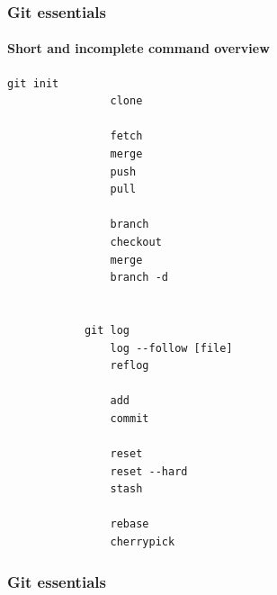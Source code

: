 \documentclass[aspectratio=169]{beamer}
\newcommand{\adjustimg}{%
  \checkoddpage%
  \ifoddpage\hspace*{\dimexpr\evensidemargin-\oddsidemargin}\else\hspace*{-\dimexpr\evensidemargin-\oddsidemargin}\fi%
}
\newcommand{\centerimg}[2][width=\textwidth]{%
  \makebox[\textwidth]{\adjustimg\texttt{[image: \#2]}}%
}
\begin{document}

    \begin{frame}[fragile]
        \frametitle{Git essentials}
        \framesubtitle{Short and incomplete command overview}
        \begin{multicols}{2}
        \begin{lstlisting}[gobble=12]
            git init                
                clone

                fetch
                merge
                push
                pull

                branch
                checkout
                merge
                branch -d


            git log                
                log --follow [file]
                reflog

                add
                commit

                reset
                reset --hard
                stash

                rebase
                cherrypick
        \end{lstlisting}
        \end{multicols}
    \end{frame}
    \begin{frame}
        \frametitle{Git essentials}
        \noindent\centerimg[width=0.4\textwidth]{git.png}
    \end{frame}
\end{document}
